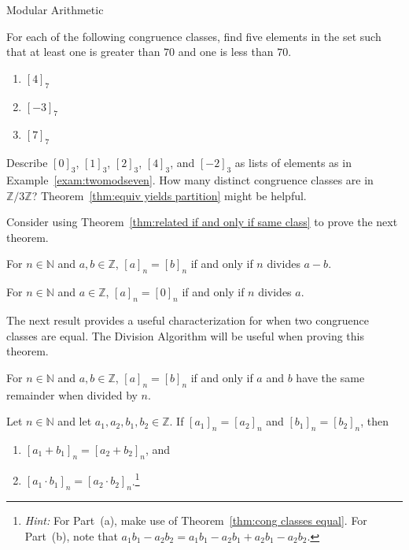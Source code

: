 \begin{section}{Modular Arithmetic}
\begin{problem}
For each of the following congruence classes, find five elements in the set such that at least one is greater than $70$ and one is less than $70$.
\begin{enumerate}[label=\textrm{(\alph*)}]
\item $[4]_7$ 
\item $[-3]_7$
\item $[7]_7$
\end{enumerate}
\end{problem}

\begin{problem}
Describe $[0]_3$, $[1]_3$, $[2]_3$, $[4]_3$, and $[-2]_3$ as lists of elements as in Example~\ref{exam:twomodseven}. How many distinct congruence classes are in $\mathbb{Z}/3\mathbb{Z}$? Theorem~\ref{thm:equiv yields partition} might be helpful.
\end{problem}

Consider using Theorem~\ref{thm:related if and only if same class} to prove the next theorem.

\begin{theorem}\label{thm:cong classes equal}
For $n\in \mathbb{N}$ and $a,b\in \mathbb{Z}$, $[a]_n = [b]_n$ if and only if $n$ divides $a-b$. 
\end{theorem}

\begin{corollary}\label{cor:divisible iff zero mod}
For $n\in \mathbb{N}$ and $a\in \mathbb{Z}$, $[a]_n = [0]_n$ if and only if $n$ divides $a$.
\end{corollary}

The next result provides a useful characterization for when two congruence classes are equal. The Division Algorithm will be useful when proving this theorem.

\begin{theorem}
For $n\in \mathbb{N}$ and $a,b\in \mathbb{Z}$, $[a]_n = [b]_n$ if and only if $a$ and $b$ have the same remainder when divided by $n$. 
\end{theorem}

\begin{theorem}
Let $n\in \mathbb{N}$ and let $a_1,a_2,b_1,b_2 \in \mathbb{Z}$. If $[a_1]_n = [a_2]_n$ and $[b_1]_n = [b_2]_n$, then 
\begin{enumerate}[label=\textrm{(\alph*)}]
\item $[a_1+b_1]_n = [a_2+b_2]_n$, and
\item $[a_1\cdot b_1]_n = [a_2\cdot b_2]_n$.\footnote{\emph{Hint:} For Part~(a), make use of Theorem~\ref{thm:cong classes equal}. For Part~(b), note that $a_1b_1-a_2b_2 = a_1b_1 -a_2b_1 + a_2b_1-a_2b_2$.}
\end{enumerate}
\end{theorem}


\end{section}
